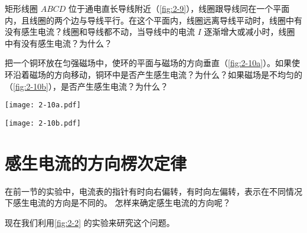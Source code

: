\begin{Practice}
\begin{question}
\begin{figurehere}
\begin{minipage}[b]{0.48\linewidth}
    \end{minipage}
  \end{figurehere}
  \item 矩形线圈 $ABCD$ 位于通电直长导线附近（\cref{fig:2-9}），线圈跟导线同在一个平面内，且线圈的两个边与导线平行。在这个平面内，线圈远离导线平动时，线圈中有没有感生电流？线圈和导线都不动，当导线中的电流 $I$ 逐渐增大或减小时，线圈中有没有感生电流？为什么？
  \item 把一个铜环放在匀强磁场中，使环的平面与磁场的方向垂直（\cref{fig:2-10a}）。如果使环沿着磁场的方向移动，铜环中是否产生感生电流？为什么？如果磁场是不均匀的（\cref{fig:2-10b}），是否产生感生电流？为什么？
  \begin{figurehere}
    \begin{minipage}{\linewidth}\centering
      \nextfloat
      \begin{minipage}{0.4\linewidth}\centering
        \texttt{[image: 2-10a.pdf]}
        \subcaption{}\label{fig:2-10a}
      \end{minipage}
      \begin{minipage}{0.4\linewidth}\centering
        \texttt{[image: 2-10b.pdf]}
        \subcaption{}\label{fig:2-10b}
      \end{minipage}
      \caption{}\label{fig:2-10}
    \end{minipage}
  \end{figurehere}
\end{question}
\end{Practice}


\section{感生电流的方向\texorpdfstring{\quad}{ }楞次定律}
在前一节的实验中，电流表的指针有时向右偏转，有时向左偏转，表示在不同情况下感生电流的方向是不同的。
怎样来确定感生电流的方向呢？

现在我们利用\cref{fig:2-2} 的实验来研究这个问题。

